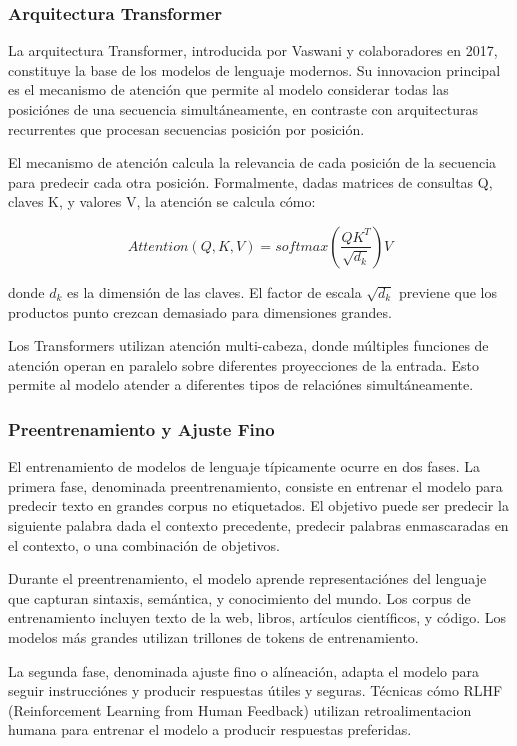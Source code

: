 \documentclass[12pt,a4paper,twoside]{book}
\begin{document}
\subsubsection{Arquitectura Transformer}

La arquitectura Transformer, introducida por Vaswani y colaboradores en 2017, constituye la base de los modelos de lenguaje modernos. Su innovacion principal es el mecanismo de atención que permite al modelo considerar todas las posiciónes de una secuencia simultáneamente, en contraste con arquitecturas recurrentes que procesan secuencias posición por posición.

El mecanismo de atención calcula la relevancia de cada posición de la secuencia para predecir cada otra posición. Formalmente, dadas matrices de consultas Q, claves K, y valores V, la atención se calcula cómo:

\begin{equation}
Attention(Q,K,V) = softmax\left(\frac{QK^T}{\sqrt{d_k}}\right)V
\end{equation}

donde $d_k$ es la dimensión de las claves. El factor de escala $\sqrt{d_k}$ previene que los productos punto crezcan demasiado para dimensiones grandes.

Los Transformers utilizan atención multi-cabeza, donde múltiples funciones de atención operan en paralelo sobre diferentes proyecciones de la entrada. Esto permite al modelo atender a diferentes tipos de relaciónes simultáneamente.

\subsubsection{Preentrenamiento y Ajuste Fino}

El entrenamiento de modelos de lenguaje típicamente ocurre en dos fases. La primera fase, denominada preentrenamiento, consiste en entrenar el modelo para predecir texto en grandes corpus no etiquetados. El objetivo puede ser predecir la siguiente palabra dada el contexto precedente, predecir palabras enmascaradas en el contexto, o una combinación de objetivos.

Durante el preentrenamiento, el modelo aprende representaciónes del lenguaje que capturan sintaxis, semántica, y conocimiento del mundo. Los corpus de entrenamiento incluyen texto de la web, libros, artículos científicos, y código. Los modelos más grandes utilizan trillones de tokens de entrenamiento.

La segunda fase, denominada ajuste fino o alíneación, adapta el modelo para seguir instrucciónes y producir respuestas útiles y seguras. Técnicas cómo RLHF (Reinforcement Learning from Human Feedback) utilizan retroalimentacion humana para entrenar el modelo a producir respuestas preferidas.
\end{document}
